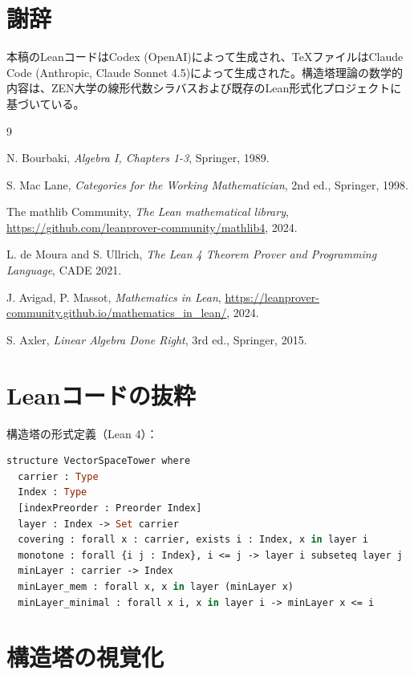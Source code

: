 \documentclass[11pt,a4paper]{ltjsarticle}
\theoremstyle{definition}
\begin{document}
\section*{謝辞}

本稿のLeanコードはCodex (OpenAI)によって生成され、TeXファイルはClaude Code (Anthropic, Claude Sonnet 4.5)によって生成された。構造塔理論の数学的内容は、ZEN大学の線形代数シラバスおよび既存のLean形式化プロジェクトに基づいている。

\begin{thebibliography}{9}

N. Bourbaki,
\textit{Algebra I, Chapters 1-3},
Springer, 1989.

S. Mac Lane,
\textit{Categories for the Working Mathematician},
2nd ed., Springer, 1998.

The mathlib Community,
\textit{The Lean mathematical library},
\url{https://github.com/leanprover-community/mathlib4}, 2024.

L. de Moura and S. Ullrich,
\textit{The Lean 4 Theorem Prover and Programming Language},
CADE 2021.

J. Avigad, P. Massot,
\textit{Mathematics in Lean},
\url{https://leanprover-community.github.io/mathematics_in_lean/}, 2024.

S. Axler,
\textit{Linear Algebra Done Right},
3rd ed., Springer, 2015.

\end{thebibliography}

\appendix

\section{Leanコードの抜粋}

構造塔の形式定義（Lean 4）：

\begin{lstlisting}[language=ML, basicstyle=\ttfamily\small, frame=single]
structure VectorSpaceTower where
  carrier : Type
  Index : Type
  [indexPreorder : Preorder Index]
  layer : Index -> Set carrier
  covering : forall x : carrier, exists i : Index, x in layer i
  monotone : forall {i j : Index}, i <= j -> layer i subseteq layer j
  minLayer : carrier -> Index
  minLayer_mem : forall x, x in layer (minLayer x)
  minLayer_minimal : forall x i, x in layer i -> minLayer x <= i
\end{lstlisting}

\section{構造塔の視覚化}
\end{document}
